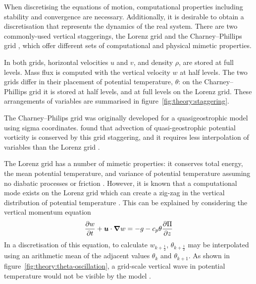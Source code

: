 When discretising the equations of motion, computational properties including stability and convergence are necessary.  Additionally, it is desirable to obtain a discretisation that represents the dynamics of the real system.  There are two commonly-used vertical staggerings, the Lorenz grid \autocite{lorenz1960} and the Charney--Phillips grid \autocite{charney-phillips1953}, which offer different sets of computational and physical mimetic properties.

In both grids, horizontal velocities $u$ and $v$, and density $\rho$, are stored at full levels.  Mass flux is computed with the vertical velocity $w$ at half levels.  The two grids differ in their placement of potential temperature, $\theta$: on the Charney--Phillips grid it is stored at half levels, and at full levels on the Lorenz grid.  These arrangements of variables are summarised in figure~\ref{fig:theory:staggering}.

The Charney--Philips grid was originally developed for a quasigeostrophic model using sigma coordinates.  \textcite{arakawa-moorthi1988} found that advection of quasi-geostrophic potential vorticity is conserved by this grid staggering, and it requires less interpolation of variables than the Lorenz grid \autocite{holdaway2013}. 

The Lorenz grid has a number of mimetic properties: it conserves total energy, the mean potential temperature, and variance of potential temperature assuming no diabatic processes or friction \autocite{arakawa-konor1996}.  However, it is known that a computational mode exists on the Lorenz grid which can create a zig-zag in the vertical distribution of potential temperature \parencites{arakawa-moorthi1988}{arakawa-konor1996}{holdaway2013b}.  This can be explained by considering the vertical momentum equation \autocite{holdaway2013}
\begin{align}
	\frac{\partial w}{\partial t} + \bm{u} \cdot \boldsymbol{\nabla} w = -g - c_p \theta \frac{\partial \Pi}{\partial z}
\end{align}
In a discretisation of this equation, to calculate $w_{k+\frac{1}{2}}$, $\theta_{k+\frac{1}{2}}$ may be interpolated using an arithmetic mean of the adjacent values $\theta_k$ and $\theta_{k+1}$.  As shown in figure~\ref{fig:theory:theta-oscillation}, a grid-scale vertical wave in potential temperature would not be visible by the model \autocite{holdaway2013}.  

